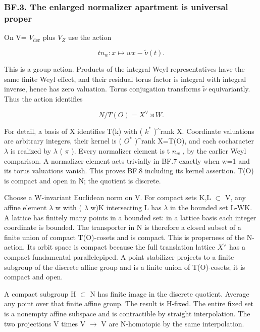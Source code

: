 \documentclass[
  11pt,
]{article}
\begin{document}
\subsubsection{BF.3. The enlarged normalizer apartment is universal
proper}\label{bf.3.-the-enlarged-normalizer-apartment-is-universal-proper}

On V= \(V_{\mathrm{der}}\) plus \(V_{Z}\) use the action

\[
 t n_w:x\mapsto wx-\widetilde\nu(t).
 \tag{BF.7}
\]

This is a group action. Products of the integral Weyl representatives
have the same finite Weyl effect, and their residual torus factor is
integral with integral inverse, hence has zero valuation. Torus
conjugation transforms \(\widetilde\nu\) equivariantly. Thus the action
identifies

\[
 N/T(O)=X^\vee\rtimes W.
 \tag{BF.8}
\]

For detail, a basis of X identifies T(k) with ( \(k^*\) )\^{}rank X.
Coordinate valuations are arbitrary integers, their kernel is ( \(O^*\)
)\^{}rank X=T(O), and each cocharacter \(\lambda\) is realized by
\(\lambda\) ( \(\pi\) ). Every normalizer element is t \(n_{w}\) , by
the earlier Weyl comparison. A normalizer element acts trivially in BF.7
exactly when w=1 and its torus valuations vanish. This proves BF.8
including its kernel assertion. T(O) is compact and open in N; the
quotient is discrete.

Choose a W-invariant Euclidean norm on V. For compact sets K,L
\(\subset\) V, any affine element \(\lambda\) w with ( \(\lambda\) w)K
intersecting L has \(\lambda\) in the bounded set L-WK. A lattice has
finitely many points in a bounded set: in a lattice basis each integer
coordinate is bounded. The transporter in N is therefore a closed subset
of a finite union of compact T(O)-cosets and is compact. This is
properness of the N-action. Its orbit space is compact because the full
translation lattice \(X^\vee\) has a compact fundamental parallelepiped.
A point stabilizer projects to a finite subgroup of the discrete affine
group and is a finite union of T(O)-cosets; it is compact and open.

A compact subgroup H \(\subset\) N has finite image in the discrete
quotient. Average any point over that finite affine group. The result is
H-fixed. The entire fixed set is a nonempty affine subspace and is
contractible by straight interpolation. The two projections V times V
\(\to\) V are N-homotopic by the same interpolation.
\end{document}
